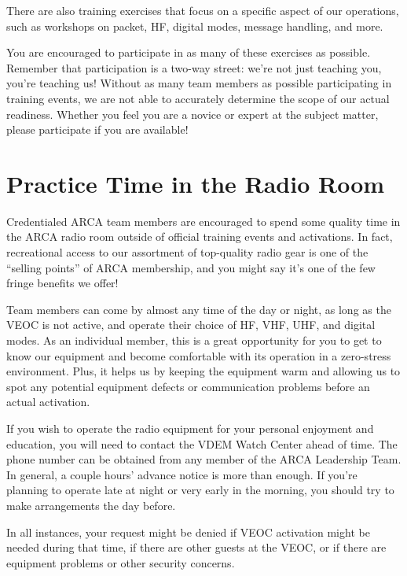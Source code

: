\documentclass[pdflatex,letterpaper,twoside,12pt]{book}
\begin{document}
There are also training exercises that focus on a specific aspect of our operations, such as workshops on packet, HF, digital modes, message handling, and more.

You are encouraged to participate in as many of these exercises as possible.  Remember that participation is a two-way street:  we're not just teaching you, you're teaching us!  Without as many team members as possible participating in training events, we are not able to accurately determine the scope of our actual readiness.  Whether you feel you are a novice or expert at the subject matter, please participate if you are available!


\section{Practice Time in the Radio Room}

Credentialed ARCA team members are encouraged to spend some quality time in the ARCA radio room outside of official training events and activations.  In fact, recreational access to our assortment of top-quality radio gear is one of the ``selling points'' of ARCA membership, and you might say it's one of the few fringe benefits we offer!

Team members can come by almost any time of the day or night, as long as the VEOC is not active, and operate their choice of HF, VHF, UHF, and digital modes.  As an individual member, this is a great opportunity for you to get to know our equipment and become comfortable with its operation in a zero-stress environment.  Plus, it helps us by keeping the equipment warm and allowing us to spot any potential equipment defects or communication problems before an actual activation.

If you wish to operate the radio equipment for your personal enjoyment and education, you will need to contact the VDEM Watch Center ahead of time.  The phone number can be obtained from any member of the ARCA Leadership Team.  In general, a couple hours' advance notice is more than enough.  If you're planning to operate late at night or very early in the morning, you should try to make arrangements the day before.

In all instances, your request might be denied if VEOC activation might be needed during that time, if there are other guests at the VEOC, or if there are equipment problems or other security concerns.
\end{document}
